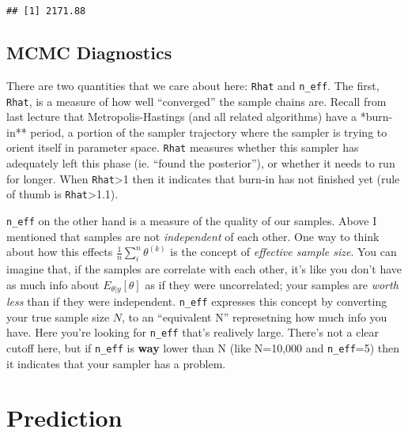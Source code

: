 \documentclass[
]{article}
\newenvironment{Shaded}{\begin{snugshade}}{\end{snugshade}}
\newcommand{\FunctionTok}[1]{\textcolor[rgb]{0.00,0.00,0.00}{#1}}
\newcommand{\NormalTok}[1]{#1}
\newcommand{\SpecialCharTok}[1]{\textcolor[rgb]{0.00,0.00,0.00}{#1}}
\begin{document}
\begin{Shaded}
\end{Shaded}

\begin{verbatim}
## [1] 2171.88
\end{verbatim}

\hypertarget{mcmc-diagnostics}{%
\subsection{MCMC Diagnostics}\label{mcmc-diagnostics}}

There are two quantities that we care about here: \texttt{Rhat} and
\texttt{n\_eff}. The first, \texttt{Rhat}, is a measure of how well
``converged'' the sample chains are. Recall from last lecture that
Metropolis-Hastings (and all related algorithms) have a *burn-in**
period, a portion of the sampler trajectory where the sampler is trying
to orient itself in parameter space. \texttt{Rhat} measures whether this
sampler has adequately left this phase (ie. ``found the posterior''), or
whether it needs to run for longer. When \texttt{Rhat}\textgreater1 then
it indicates that burn-in has not finished yet (rule of thumb is
\texttt{Rhat}\textgreater1.1).

\texttt{n\_eff} on the other hand is a measure of the quality of our
samples. Above I mentioned that samples are not \emph{independent} of
each other. One way to think about how this effects
\(\frac{1}{n} \sum_i^n \theta^{(k)}\) is the concept of \emph{effective
sample size}. You can imagine that, if the samples are correlate with
each other, it's like you don't have as much info about
\(E_{\theta|y}[\theta]\) as if they were uncorrelated; your samples are
\emph{worth less} than if they were independent. \texttt{n\_eff}
expresses this concept by converting your true sample size \(N\), to an
``equivalent N'' represetning how much info you have. Here you're
looking for \texttt{n\_eff} that's realively large. There's not a clear
cutoff here, but if \texttt{n\_eff} is \textbf{way} lower than N (like
N=10,000 and \texttt{n\_eff}=5) then it indicates that your sampler has
a problem.

\hypertarget{prediction}{%
\section{Prediction}\label{prediction}}
\end{document}
